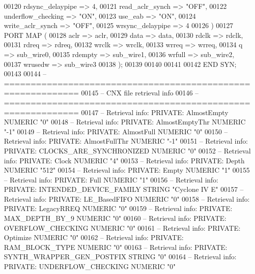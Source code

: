 \begin{DoxyCode}
{00120         rdsync\_delaypipe => \textcolor{vhdllogic}{4},
00121         read\_aclr\_synch => \textcolor{keyword}{"OFF"},
00122         underflow\_checking => \textcolor{keyword}{"ON"},
00123         use\_eab => \textcolor{keyword}{"ON"},
00124         write\_aclr\_synch => \textcolor{keyword}{"OFF"},
00125         wrsync\_delaypipe => \textcolor{vhdllogic}{4}
00126     \textcolor{vhdlchar}{)}
00127     \textcolor{keywordflow}{PORT} \textcolor{keywordflow}{MAP} (
00128         aclr => aclr,
00129         data => data,
00130         rdclk => rdclk,
00131         rdreq => rdreq,
00132         wrclk => wrclk,
00133         wrreq => wrreq,
00134         q => sub_wire0,
00135         rdempty => sub_wire1,
00136         wrfull => sub_wire2,
00137         wrusedw => sub_wire3
00138     \textcolor{vhdlchar}{)};
00139 
00140 
00141 
00142 \textcolor{keywordflow}{END} \textcolor{vhdlchar}{SYN};
00143 
00144 \textcolor{keyword}{-- ============================================================}
00145 \textcolor{keyword}{-- CNX file retrieval info}
00146 \textcolor{keyword}{-- ============================================================}
00147 \textcolor{keyword}{-- Retrieval info: PRIVATE: AlmostEmpty NUMERIC "0"}
00148 \textcolor{keyword}{-- Retrieval info: PRIVATE: AlmostEmptyThr NUMERIC "-1"}
00149 \textcolor{keyword}{-- Retrieval info: PRIVATE: AlmostFull NUMERIC "0"}
00150 \textcolor{keyword}{-- Retrieval info: PRIVATE: AlmostFullThr NUMERIC "-1"}
00151 \textcolor{keyword}{-- Retrieval info: PRIVATE: CLOCKS\_ARE\_SYNCHRONIZED NUMERIC "0"}
00152 \textcolor{keyword}{-- Retrieval info: PRIVATE: Clock NUMERIC "4"}
00153 \textcolor{keyword}{-- Retrieval info: PRIVATE: Depth NUMERIC "512"}
00154 \textcolor{keyword}{-- Retrieval info: PRIVATE: Empty NUMERIC "1"}
00155 \textcolor{keyword}{-- Retrieval info: PRIVATE: Full NUMERIC "1"}
00156 \textcolor{keyword}{-- Retrieval info: PRIVATE: INTENDED\_DEVICE\_FAMILY STRING "Cyclone IV E"}
00157 \textcolor{keyword}{-- Retrieval info: PRIVATE: LE\_BasedFIFO NUMERIC "0"}
00158 \textcolor{keyword}{-- Retrieval info: PRIVATE: LegacyRREQ NUMERIC "0"}
00159 \textcolor{keyword}{-- Retrieval info: PRIVATE: MAX\_DEPTH\_BY\_9 NUMERIC "0"}
00160 \textcolor{keyword}{-- Retrieval info: PRIVATE: OVERFLOW\_CHECKING NUMERIC "0"}
00161 \textcolor{keyword}{-- Retrieval info: PRIVATE: Optimize NUMERIC "0"}
00162 \textcolor{keyword}{-- Retrieval info: PRIVATE: RAM\_BLOCK\_TYPE NUMERIC "0"}
00163 \textcolor{keyword}{-- Retrieval info: PRIVATE: SYNTH\_WRAPPER\_GEN\_POSTFIX STRING "0"}
00164 \textcolor{keyword}{-- Retrieval info: PRIVATE: UNDERFLOW\_CHECKING NUMERIC "0"}
}
\end{DoxyCode}
